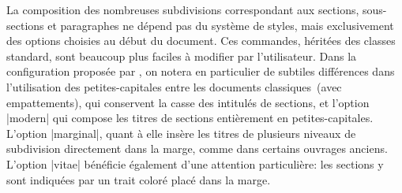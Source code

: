 \begin{noprint}
{	%
	\renewcommand{\chaptitlefont}{\raggedright\Large\chaptercolour\sffamily\scshape}
	\renewcommand{\chapnamefont}{\chaptitlefont}
	\renewcommand{\chapnumfont}{\chaptitlefont}
	\renewcommand{\chapternamenum}{\space}
	\renewcommand{\printchapternum}{%
		\chapnumfont%
		\ifanappendix					\Alph{chapter}%
		\else\ifdefstring{\languagename}{french}
			{\ifnum\value{chapter}=1	\ordinalstring{chapter}[m]%
			 \else						\MakeLowercase{\thechapter}\fi}
			{\MakeLowercase{\thechapter}}\fi}
	\renewcommand{\@chapapp}{\chapnamefont\MakeLowercase\chaptername}
	\renewcommand{\printchaptertitle}[1]{\chaptitlefont\MakeUppercase{##1}}
	\renewcommand{\afterchapternum}{\par\nobreak\vskip\midchapskip}
	\setlength{\beforechapskip}{\baselinestretch\addto@Large}
	\addtolength{\beforechapskip}{\baselineskip}
	\setlength{\midchapskip}{\baselinestretch\addto@Large}
	\setlength{\afterchapskip}{2\baselineskip}
	\renewcommand{\chapterblock}{%
		\setlength{\afterchapskip}{\baselineskip}}

}
\if@modern{}\fi
\end{noprint}

La composition des nombreuses subdivisions correspondant aux sections, sous-sections et paragraphes ne dépend pas du système de styles, mais exclusivement des options choisies au début du document. Ces commandes, héritées des classes standard, sont beaucoup plus faciles à modifier par l'utilisateur. Dans la configuration proposée par \frenchlaw, on notera en particulier de subtiles différences dans l'utilisation des petites-capitales entre les documents classiques~(avec empattements), qui conservent la casse des intitulés de sections, et l'option |modern| qui compose les titres de sections entièrement en petites-capitales. L'option |marginal|, quant à elle insère les titres de plusieurs niveaux de subdivision directement dans la marge, comme dans certains ouvrages anciens. L'option |vitae| bénéficie également d'une attention particulière: les sections y sont indiquées par un trait coloré placé dans la marge.

\begin{noprint}
\end{noprint}

